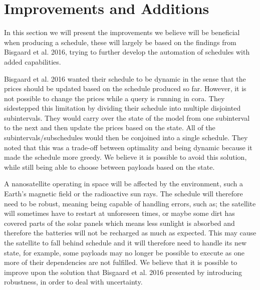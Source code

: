 \section{Improvements and Additions}
In this section we will present the improvements we believe will be beneficial when producing a schedule, these will largely be based on the findings from Bisgaard et al. 2016\cite{gomx3}, trying to further develop the automation of schedules with added capabilities.

Bisgaard et al. 2016\cite{gomx3} wanted their schedule to be dynamic in the sense that the prices should be updated based on the schedule produced so far.
However, it is not possible to change the prices while a query is running in \gls{cora}.
They sidestepped this limitation by dividing their schedule into multiple disjointed subintervals. 
They would carry over the state of the model from one subinterval to the next and then update the prices based on the state.
All of the subintervals/subschedules would then be conjoined into a single schedule.
They noted that this was a trade-off between optimality and being dynamic because it made the schedule more greedy.
We believe it is possible to avoid this solution, while still being able to choose between payloads based on the state.

A nanosatellite operating in space will be affected by the environment, such a Earth's magnetic field or the radioactive sun rays.
The schedule will therefore need to be robust, meaning being capable of handling errors, such as; the satellite will sometimes have to restart at unforeseen times, or maybe some dirt has covered parts of the solar panels which means less sunlight is absorbed and therefore the batteries will not be recharged as much as expected.
This may cause the satellite to fall behind schedule and it will therefore need to handle its new state, for example, some payloads may no longer be possible to execute as one more of their dependencies are not fulfilled. 
We believe that it is possible to improve upon the solution that Bisgaard et al. 2016\cite{gomx3} presented by introducing robustness, in order to deal with uncertainty.

